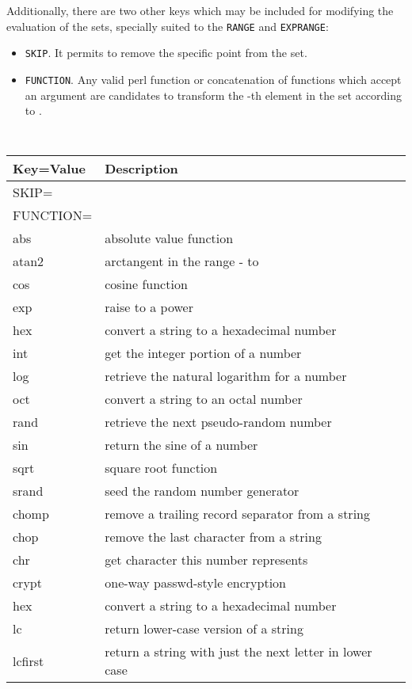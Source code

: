 \documentclass[12pt,a4paper]{article}
\begin{document}
Additionally, there are two other keys which may be included for modifying the evaluation of the sets, specially suited to the {\tt RANGE} and {\tt EXPRANGE}:
\begin{itemize}
\item{\tt SKIP}. It permits to remove the specific point from the set.
\item{\tt FUNCTION}. Any valid perl function or concatenation of functions which accept an argument are candidates to transform the -th element in the set  according to .
\end{itemize}
\begin{table}[!ht]
\center
{\tt
\begin{tabular}{lll}
\hline
\textrm{Key=Value} & \textrm{Description}\\
\hline
SKIP=&\\
FUNCTION= &\\
 abs&{\rm absolute value function}\\
 atan2&{\rm arctangent in the range - to }\\
 cos&{\rm cosine function}\\
 exp&{\rm raise to a power}\\
  hex&{\rm convert a string to a hexadecimal number}\\
 int&{\rm get the integer portion of a number}\\
 log&{\rm retrieve the natural logarithm for a number}\\
 oct&{\rm convert a string to an octal number}\\
 rand&{\rm retrieve the next pseudo-random number}\\
 sin&{\rm return the sine of a number}\\
 sqrt&{\rm square root function}\\
 srand&{\rm seed the random number generator}\\
 chomp&{\rm remove a trailing record separator from a string}\\
 chop&{\rm remove the last character from a string}\\
 chr&{\rm get character this number represents}\\
 crypt&{\rm one-way passwd-style encryption}\\
 hex&{\rm convert a string to a hexadecimal number}\\
 lc&{\rm return lower-case version of a string}\\
 lcfirst&{\rm return a string with just the next letter in lower case}\\

\end{tabular}}
\end{table}
\end{document}
